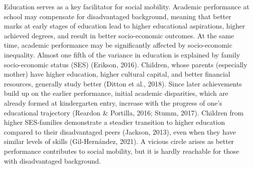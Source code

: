 \documentclass{article}
\begin{document}
Education serves as a key facilitator for social mobility. Academic
performance at school may compensate for disadvantaged background,
meaning that better marks at early stages of education lead to higher
educational aspirations, higher achieved degrees, and result in better
socio-economic outcomes. At the same time, academic performance may be
significantly affected by socio-economic inequality. Almost one fifth of
the variance in education is explained by family socio-economic status
(SES) (Erikson, 2016). Children, whose parents (especially mother) have
higher education, higher cultural capital, and better financial
resources, generally study better (Ditton et al., 2018). Since later
achievements build up on the earlier performance, initial academic
disparities, which are already formed at kindergarten entry, increase
with the progress of one's educational trajectory (Reardon \& Portilla,
2016; Stumm, 2017). Children from higher SES-families demonstrate a
steadier transition to higher education compared to their disadvantaged
peers (Jackson, 2013), even when they have similar levels of skills
(Gil-Hernández, 2021). A vicious circle arises as better performance
contributes to social mobility, but it is hardly reachable for those
with disadvantaged background.
\end{document}
